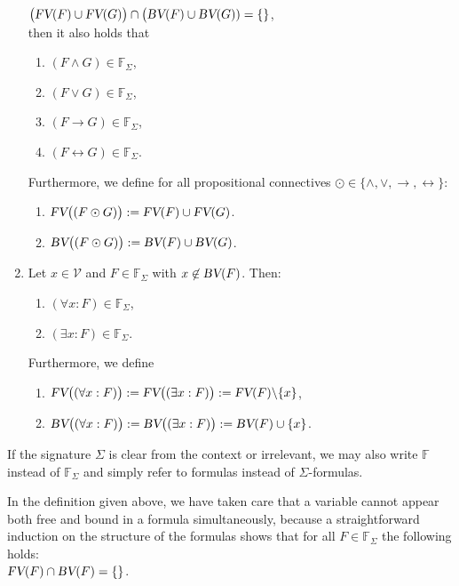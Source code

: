 \begin{Definition}
\begin{enumerate}
          \hspace*{1.3cm}
          $\bigl(\textsl{FV}(F) \cup \textsl{FV}(G)\bigr) \cap \bigl(\textsl{BV}(F) \cup \textsl{BV}(G)) = \{\}$,
          \\[0.2cm]
          then it also holds that
          \begin{enumerate}
          \item $(F \wedge G) \in \mathbb{F}_\Sigma$,
          \item $(F \vee G) \in \mathbb{F}_\Sigma$,
          \item $(F \rightarrow G) \in \mathbb{F}_\Sigma$,
          \item $(F \leftrightarrow G) \in \mathbb{F}_\Sigma$.
          \end{enumerate}
          Furthermore, we define for all propositional connectives $\odot \in \{ \wedge, \vee, \rightarrow, \leftrightarrow \}$:
          \begin{enumerate}
          \item $\textsl{FV}\bigl((F \odot G) \bigr) := \textsl{FV}(F) \cup \textsl{FV}(G)$.
          \item $\textsl{BV}\bigl((F \odot G) \bigr) := \textsl{BV}(F) \cup \textsl{BV}(G)$.
          \end{enumerate}
    \item Let $x \in \mathcal{V}$ and $F \in \mathbb{F}_\Sigma$ with $x \not\in \textsl{BV}(F)$. Then:
          \begin{enumerate}
          \item $(\forall x : F) \in \mathbb{F}_\Sigma$,
          \item $(\exists x : F) \in \mathbb{F}_\Sigma$.
          \end{enumerate}
          Furthermore, we define
          \begin{enumerate}
          \item $\textsl{FV}\bigl( (\forall x : F) \bigr) := \textsl{FV}\bigl( (\exists x : F) \bigr) := \textsl{FV}(F) \backslash \{x\}$,
          \item $\textsl{BV}\bigl( (\forall x : F) \bigr) := \textsl{BV}\bigl( (\exists x : F) \bigr) := \textsl{BV}(F) \cup \{x\}$.  
          \end{enumerate}
    \end{enumerate}
    If the signature $\Sigma$ is clear from the context or irrelevant, we may also write
    $\mathbb{F}$ instead of $\mathbb{F}_\Sigma$ and simply refer to formulas instead of $\Sigma$-formulas.
    \eox
\end{Definition}

In the definition given above, we have taken care that a variable cannot appear both free and bound in a
formula simultaneously, because a straightforward induction on the structure of the formulas shows that for all 
$F \in \mathbb{F}_\Sigma$ the following holds:  
\\[0.2cm]
\hspace*{1.3cm}
$ \textsl{FV}(F) \cap \textsl{BV}(F) = \{\}$. 

